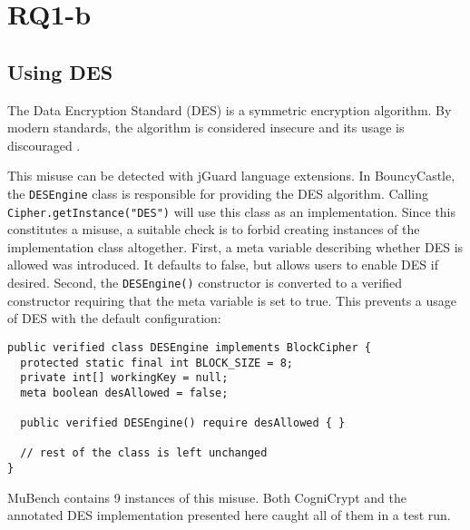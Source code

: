 \documentclass{article}
\begin{document}


\section{RQ1-b}

\subsection{Using DES}

The Data Encryption Standard (DES) is a symmetric encryption algorithm.
By modern standards, the algorithm is considered insecure and its usage is discouraged \cite{DesInsecure}.

This misuse can be detected with jGuard language extensions. In BouncyCastle, the \texttt{DESEngine} class
is responsible for providing the DES algorithm.
Calling \texttt{Cipher.\allowbreak getInstance("DES")} will use this class as an implementation.
Since this constitutes a misuse, a suitable check is to forbid creating instances of the implementation class
altogether.
First, a meta variable describing whether DES is allowed was introduced. It defaults to false, but allows users to enable DES if desired.
Second, the \texttt{DESEngine()} constructor is converted to a verified constructor requiring that the
meta variable is set to true. This prevents a usage of DES with the default configuration:

\begin{lstlisting}[style=jGuard]
public verified class DESEngine implements BlockCipher {
  protected static final int BLOCK_SIZE = 8; 
  private int[] workingKey = null; 
  meta boolean desAllowed = false; 

  public verified DESEngine() require desAllowed { }

  // rest of the class is left unchanged
}
\end{lstlisting}

MuBench contains \num{9} instances of this misuse.
Both CogniCrypt and the annotated DES implementation presented here caught all of them
in a test run.
\end{document}
